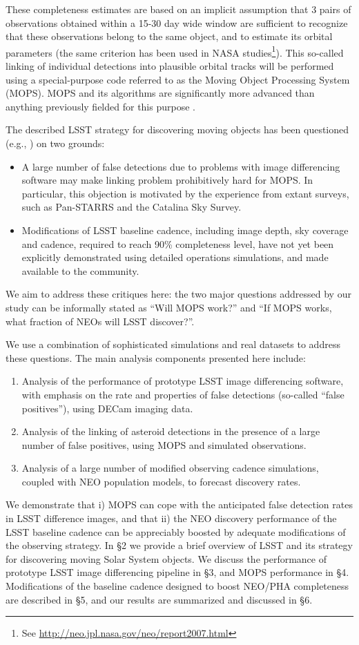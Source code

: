 These completeness estimates are based on an implicit assumption that 3 pairs of observations
obtained within a 15-30 day wide window are sufficient to recognize that these observations belong
to the same object, and to estimate its orbital parameters (the same criterion has been used in NASA
studies\footnote{See \url{http://neo.jpl.nasa.gov/neo/report2007.html}}).
This so-called linking of individual detections into plausible orbital tracks
will be performed using a special-purpose code referred to as the Moving Object
Processing System (MOPS). MOPS and its algorithms are significantly more
advanced than anything previously fielded for this purpose \citep{denneau13}. 

The described LSST strategy for discovering moving objects has been questioned (e.g., \citealt{GMS2016}) on
two grounds:
\begin{itemize}
\item A large number of false detections due to problems with image differencing software may
make linking problem prohibitively hard for MOPS. In particular, this objection is motivated by the experience
from extant surveys, such as Pan-STARRS and the Catalina Sky Survey.
\item Modifications of LSST baseline cadence, including image depth, sky coverage and cadence,
required to reach 90\% completeness level, have not yet been explicitly demonstrated using detailed
operations simulations, and made available to the community.
\end{itemize}
We aim to address these critiques here: the two major questions addressed by our study can be informally
stated as ``Will MOPS work?'' and ``If MOPS works, what fraction of  NEOs will LSST discover?''.

We use a combination of sophisticated simulations and real datasets to address these questions.
The main analysis components presented here include:
\begin{enumerate}
\item Analysis of the performance of prototype LSST image differencing software, with emphasis on the rate and
    properties of false detections (so-called ``false positives''), using DECam imaging data.
\item Analysis of the linking of asteroid detections in the presence of a large number of false positives, using MOPS
         and simulated observations.
\item Analysis of a large number of modified observing cadence simulations, coupled with NEO population
          models, to forecast discovery rates.
\end{enumerate}

We demonstrate that i) MOPS can cope with the anticipated false detection rates
in LSST difference images, and that ii) the NEO discovery performance of the LSST baseline cadence
can be appreciably boosted by adequate modifications of the observing strategy.
In \S2 we provide a brief overview of LSST and its strategy for discovering moving Solar
System objects. We discuss the performance of prototype LSST image differencing pipeline
in \S3, and MOPS performance in \S4. Modifications of the baseline cadence designed to
boost NEO/PHA completeness are described in \S5, and our results are summarized and
discussed in \S6.
